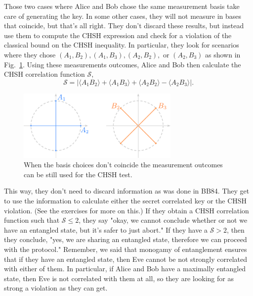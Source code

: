 Those two cases where Alice and Bob chose the same measurement basis take care of generating the key. In some other cases, they will not measure in bases that coincide, but that's all right. They don't discard these results, but instead  use them to compute the CHSH expression and check for a violation of the classical bound on the CHSH inequality. In particular, they look for scenarios where they chose $(A_1,B_2), (A_1,B_3), (A_2,B_2),$ or $(A_2,B_3)$ as shown in Fig.~\ref{fig:10-3_e91_example_CHSH}.
Using these measurements outcomes, Alice and Bob then calculate the CHSH correlation function $\mathcal{S}$,
\begin{equation}
    \mathcal{S} = |\langle A_1B_2\rangle + \langle A_1B_3\rangle + \langle A_2B_2\rangle - \langle A_2B_3\rangle|.
\end{equation}
\begin{figure}[t]
    \centering
    \includegraphics[width=0.7\textwidth]{lesson10/10-3_bases_CHSH.pdf}
    \caption[E91 - CHSH bases]{When the basis choices don't coincide the measurement outcomes can be still used for the CHSH test.}
    \label{fig:10-3_e91_example_CHSH}
\end{figure}

This way, they don't need to discard information as was done in BB84. They get to use the information to calculate either the secret correlated key or the CHSH violation. (See the exercises for more on this.) If they obtain a CHSH correlation function such that $\mathcal{S} \leq 2$, they say "okay, we cannot conclude whether or not we have an entangled state, but it's safer to just abort."  If they have a $\mathcal{S} > 2$, then they conclude, "yes, we are sharing an entangled state, therefore we can proceed with the protocol." Remember, we said that monogamy of entanglement ensures that if they have an entangled state, then Eve cannot be not strongly correlated with either of them.  In particular, if Alice and Bob have a maximally entangled state, then Eve is not correlated with them at all, so they are looking for as strong a violation as they can get.

